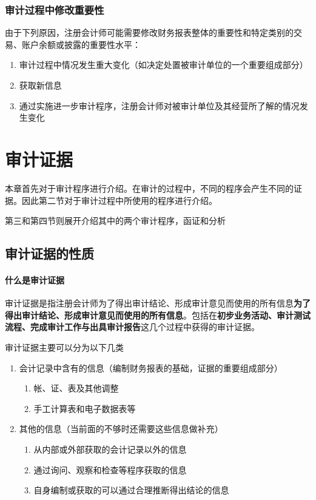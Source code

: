 \documentclass[UTF8,12pt]{ctexart}
\numberwithin{equation}{section} %
\numberwithin{figure}{section}
\numberwithin{table}{section}
\begin{document}
	
	\subsubsection{审计过程中修改重要性}
	由于下列原因，注册会计师可能需要修改财务报表整体的重要性和特定类别的交易、账户余额或披露的重要性水平：
	\begin{enumerate}
		\item 审计过程中情况发生重大变化（如决定处置被审计单位的一个重要组成部分）
		
		\item 获取新信息
		
		\item 通过实施进一步审计程序，注册会计师对被审计单位及其经营所了解的情况发生变化
	\end{enumerate}
	
	
	
	
	
	\newpage
	\section{审计证据}	
	本章首先对于审计程序进行介绍。在审计的过程中，不同的程序会产生不同的证据。因此第二节对于审计过程中所使用的程序进行介绍。
	
	第三和第四节则展开介绍其中的两个审计程序，函证和分析
	
	\subsection{审计证据的性质}
	\paragraph{什么是审计证据}审计证据是指注册会计师为了得出审计结论、形成审计意见而使用的所有信息\textbf{为了得出审计结论、形成审计意见而使用的所有信息}。包括在\textbf{初步业务活动、审计测试流程、完成审计工作与出具审计报告}这几个过程中获得的审计证据。
	
	审计证据主要可以分为以下几类
	\begin{enumerate}
		\item 会计记录中含有的信息（编制财务报表的基础，证据的重要组成部分）
		\begin{enumerate}
			\item 帐、证、表及其他调整
			
			\item 手工计算表和电子数据表等
		\end{enumerate}
		
		\item 其他的信息（当前面的不够时还需要这些信息做补充）
		\begin{enumerate}
			\item 从内部或外部获取的会计记录以外的信息
			
			\item 通过询问、观察和检查等程序获取的信息
			
			\item 自身编制或获取的可以通过合理推断得出结论的信息
		\end{enumerate}
	\end{enumerate}
	
\end{document}
